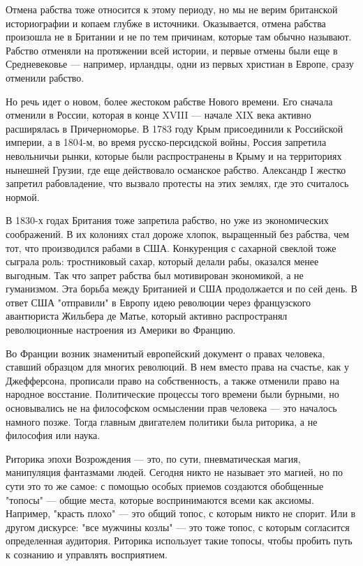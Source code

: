 Отмена рабства тоже относится к этому периоду, но мы не верим британской историографии и копаем глубже в источники. Оказывается, отмена рабства произошла не в Британии и не по тем причинам, которые там обычно называют. Рабство отменяли на протяжении всей истории, и первые отмены были еще в Средневековье --- например, ирландцы, одни из первых христиан в Европе, сразу отменили рабство.

Но речь идет о новом, более жестоком рабстве Нового времени. Его сначала отменили в России, которая в конце XVIII --- начале XIX века активно расширялась в Причерноморье. В 1783 году Крым присоединили к Российской империи, а в 1804-м, во время русско-персидской войны, Россия запретила невольничьи рынки, которые были распространены в Крыму и на территориях нынешней Грузии, где еще действовало османское рабство. Александр I жестко запретил рабовладение, что вызвало протесты на этих землях, где это считалось нормой.

В 1830-х годах Британия тоже запретила рабство, но уже из экономических соображений. В их колониях стал дороже хлопок, выращенный без рабства, чем тот, что производился рабами в США. Конкуренция с сахарной свеклой тоже сыграла роль: тростниковый сахар, который делали рабы, оказался менее выгодным. Так что запрет рабства был мотивирован экономикой, а не гуманизмом. Эта борьба между Британией и США продолжается и по сей день. В ответ США "отправили" в Европу идею революции через французского авантюриста Жильбера де Матье, который активно распространял революционные настроения из Америки во Францию.

Во Франции возник знаменитый европейский документ о правах человека, ставший образцом для многих революций. В нем вместо права на счастье, как у Джефферсона, прописали право на собственность, а также отменили право на народное восстание. Политические процессы того времени были бурными, но основывались не на философском осмыслении прав человека --- это началось намного позже. Тогда главным двигателем политики была риторика, а не философия или наука.

Риторика эпохи Возрождения --- это, по сути, пневматическая магия, манипуляция фантазмами людей. Сегодня никто не называет это магией, но по сути это то же самое: с помощью особых приемов создаются обобщенные "топосы" --- общие места, которые воспринимаются всеми как аксиомы. Например, "красть плохо" --- это общий топос, с которым никто не спорит. Или в другом дискурсе: "все мужчины козлы" --- это тоже топос, с которым согласится определенная аудитория. Риторика использует такие топосы, чтобы пробить путь к сознанию и управлять восприятием.

